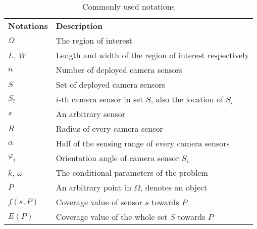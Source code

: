 \renewcommand{\arraystretch}{1.5}
\begin{table}
\centering
\caption{Commonly used notations}
\begin{tabularx}{.8\textwidth}{!{\vline width 1.2pt}Y!{\vline width 1.2pt}Z!{\vline width 1.2pt}}
	{\bfseries Notations} & {\bfseries Description}\\
	$\Omega$ & The region of interest \\
	$L$, $W$ & Length and width of the region of interest respectively \\
	$n$ & Number of deployed camera sensors \\
	$S$ & Set of deployed camera sensors \\
	$S_i$ & $i$-th camera sensor in set $S$, also the location of $S_i$ \\
	$s$ & An arbitrary sensor \\
	$R$ & Radius of every camera sensor \\ 
	$\alpha$ & Half of the sensing range of every camera sensors \\
	$\varphi_i$ & Orientation angle of camera sensor $S_i$ \\
	$k$, $\omega$ & The conditional parameters of the problem \\
	$P$ & An arbitrary point in $\Omega$, denotes an object \\
	$f(s, P)$ & Coverage value of sensor $s$ towards $P$ \\
	$E(P)$ & Coverage value of the whole set $S$ towards $P$ \\

\end{tabularx}
\end{table}
